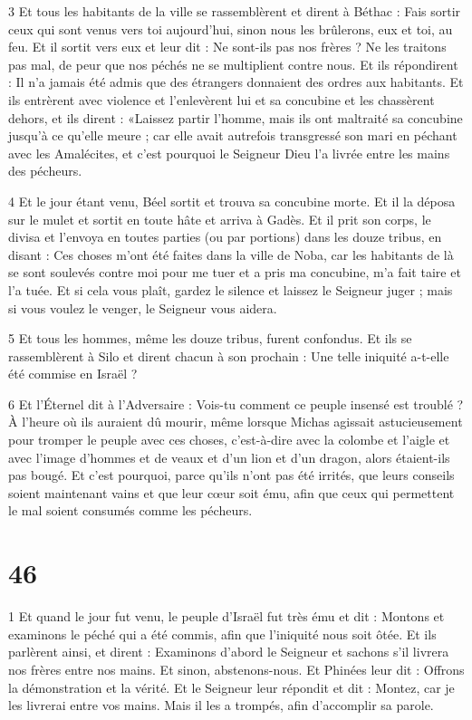 \par 3 Et tous les habitants de la ville se rassemblèrent et dirent à Béthac : Fais sortir ceux qui sont venus vers toi aujourd'hui, sinon nous les brûlerons, eux et toi, au feu. Et il sortit vers eux et leur dit : Ne sont-ils pas nos frères ? Ne les traitons pas mal, de peur que nos péchés ne se multiplient contre nous. Et ils répondirent : Il n'a jamais été admis que des étrangers donnaient des ordres aux habitants. Et ils entrèrent avec violence et l'enlevèrent lui et sa concubine et les chassèrent dehors, et ils dirent : «Laissez partir l'homme, mais ils ont maltraité sa concubine jusqu'à ce qu'elle meure ; car elle avait autrefois transgressé son mari en péchant avec les Amalécites, et c'est pourquoi le Seigneur Dieu l'a livrée entre les mains des pécheurs.

\par 4 Et le jour étant venu, Béel sortit et trouva sa concubine morte. Et il la déposa sur le mulet et sortit en toute hâte et arriva à Gadès. Et il prit son corps, le divisa et l'envoya en toutes parties (ou par portions) dans les douze tribus, en disant : Ces choses m'ont été faites dans la ville de Noba, car les habitants de là se sont soulevés contre moi pour me tuer et a pris ma concubine, m'a fait taire et l'a tuée. Et si cela vous plaît, gardez le silence et laissez le Seigneur juger ; mais si vous voulez le venger, le Seigneur vous aidera.

\par 5 Et tous les hommes, même les douze tribus, furent confondus. Et ils se rassemblèrent à Silo et dirent chacun à son prochain : Une telle iniquité a-t-elle été commise en Israël ?

\par 6 Et l'Éternel dit à l'Adversaire : Vois-tu comment ce peuple insensé est troublé ? À l'heure où ils auraient dû mourir, même lorsque Michas agissait astucieusement pour tromper le peuple avec ces choses, c'est-à-dire avec la colombe et l'aigle et avec l'image d'hommes et de veaux et d'un lion et d'un dragon, alors étaient-ils pas bougé. Et c'est pourquoi, parce qu'ils n'ont pas été irrités, que leurs conseils soient maintenant vains et que leur cœur soit ému, afin que ceux qui permettent le mal soient consumés comme les pécheurs.

\chapter{46}

\par 1 Et quand le jour fut venu, le peuple d'Israël fut très ému et dit : Montons et examinons le péché qui a été commis, afin que l'iniquité nous soit ôtée. Et ils parlèrent ainsi, et dirent : Examinons d'abord le Seigneur et sachons s'il livrera nos frères entre nos mains. Et sinon, abstenons-nous. Et Phinées leur dit : Offrons la démonstration et la vérité. Et le Seigneur leur répondit et dit : Montez, car je les livrerai entre vos mains. Mais il les a trompés, afin d'accomplir sa parole.

